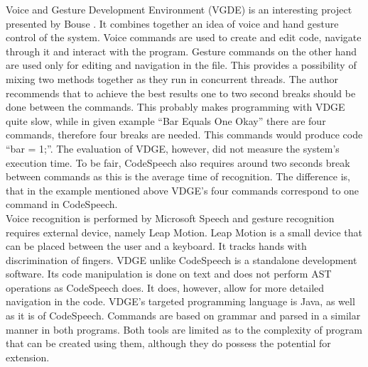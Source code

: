 Voice and Gesture Development Environment (VGDE) is an interesting project presented by Bouse \cite{Bouse2017}. It combines together an idea of voice and hand gesture control of the system. Voice commands are used to create and edit code, navigate through it and interact with the program. Gesture commands on the other hand are used only for editing and navigation in the file. This provides a possibility of mixing two methods together as they run in concurrent threads. The author recommends that to achieve the best results one to two second breaks should be done between the commands. This probably makes programming with VDGE quite slow, while in given example ``Bar Equals One Okay'' there are four commands, therefore four breaks are needed. This commands would produce code ``bar = 1;''. The evaluation of VDGE, however, did not measure the system's execution time. To be fair, CodeSpeech also requires around two seconds break between commands as this is the average time of recognition. The difference is, that in the example mentioned above VDGE's four commands correspond to one command in CodeSpeech. \\
Voice recognition is performed by Microsoft Speech and gesture recognition requires external device, namely Leap Motion. Leap Motion is a small device that can be placed between the user and a keyboard. It tracks hands with discrimination of fingers. VDGE unlike CodeSpeech is a standalone development software. Its code manipulation is done on text and does not perform AST operations as CodeSpeech does. It does, however, allow for more detailed navigation in the code. VDGE's targeted programming language is Java, as well as it is of CodeSpeech. Commands are based on grammar and parsed in a similar manner in both programs. Both tools are limited as to the complexity of program that can be created using them, although they do possess the potential for extension.

